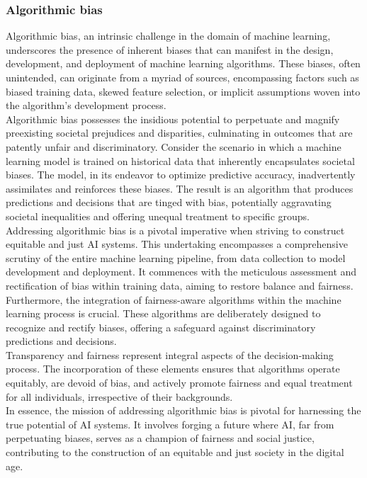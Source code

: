 \documentclass[12pt,a4paper,openright,twoside]{book}
\begin{document}
\subsubsection{Algorithmic bias}

Algorithmic bias, an intrinsic challenge in the domain of machine learning, underscores the presence of inherent biases that can manifest in the design, development, and deployment of machine learning algorithms. These biases, often unintended, can originate from a myriad of sources, encompassing factors such as biased training data, skewed feature selection, or implicit assumptions woven into the algorithm's development process. \\
Algorithmic bias possesses the insidious potential to perpetuate and magnify preexisting societal prejudices and disparities, culminating in outcomes that are patently unfair and discriminatory. Consider the scenario in which a machine learning model is trained on historical data that inherently encapsulates societal biases. The model, in its endeavor to optimize predictive accuracy, inadvertently assimilates and reinforces these biases. The result is an algorithm that produces predictions and decisions that are tinged with bias, potentially aggravating societal inequalities and offering unequal treatment to specific groups. \cite{10.1145/2983270} \\
Addressing algorithmic bias is a pivotal imperative when striving to construct equitable and just AI systems. This undertaking encompasses a comprehensive scrutiny of the entire machine learning pipeline, from data collection to model development and deployment. It commences with the meticulous assessment and rectification of bias within training data, aiming to restore balance and fairness. \\
Furthermore, the integration of fairness-aware algorithms within the machine learning process is crucial. These algorithms are deliberately designed to recognize and rectify biases, offering a safeguard against discriminatory predictions and decisions. \\
Transparency and fairness represent integral aspects of the decision-making process. The incorporation of these elements ensures that algorithms operate equitably, are devoid of bias, and actively promote fairness and equal treatment for all individuals, irrespective of their backgrounds. \\
In essence, the mission of addressing algorithmic bias is pivotal for harnessing the true potential of AI systems. It involves forging a future where AI, far from perpetuating biases, serves as a champion of fairness and social justice, contributing to the construction of an equitable and just society in the digital age.
\end{document}
